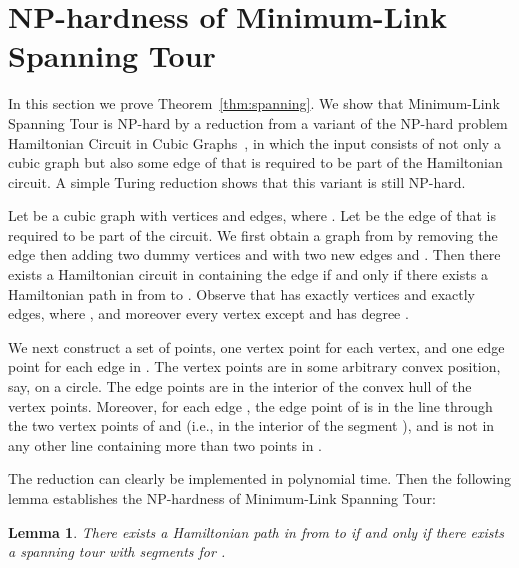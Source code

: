 \documentclass[letterpaper,11pt]{article}
\newtheorem{lemma}{Lemma}
\def\ie{{i.e.}}
\begin{document}
\section{NP-hardness of {\sc Minimum-Link Spanning Tour}}

In this section we prove Theorem~\ref{thm:spanning}.
We show that {\sc Minimum-Link Spanning Tour} is NP-hard by a reduction from
a variant of the NP-hard problem
{\sc Hamiltonian Circuit in Cubic Graphs}~\cite{GJS74},
in which the input consists of not only a cubic graph 
but also some edge  of  that is required to be part of the Hamiltonian
circuit.
A simple Turing reduction shows that this variant is still NP-hard.

Let  be a cubic graph with  vertices and  edges, where .
Let  be the edge of  that is required to be part of the circuit.
We first obtain a graph  from  by removing the edge 
then adding two dummy vertices  and  with two new edges
 and .
Then there exists a Hamiltonian circuit in  containing the edge 
if and only if
there exists a Hamiltonian path in  from  to .
Observe that  has exactly  vertices and exactly  edges,
where ,
and moreover every vertex except  and  has degree .

We next construct a set  of  points,
one vertex point for each vertex,
and one edge point for each edge in .
The  vertex points are in some arbitrary convex position,
say, on a circle.
The  edge points are in the interior of the convex hull
of the  vertex points.
Moreover, for each edge ,
the edge point of  is in the line through the two vertex points
of  and  (\ie, in the interior of the segment ),
and is not in any other line containing more than two points in .

The reduction can clearly be implemented in polynomial time.
Then the following lemma establishes the NP-hardness
of {\sc Minimum-Link Spanning Tour}:

\begin{lemma}
There exists a Hamiltonian path in  from  to 
if and only if
there exists a spanning tour with  segments for .
\end{lemma}
\end{document}
